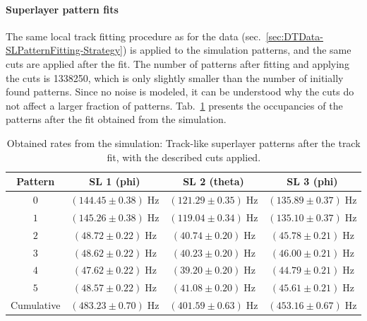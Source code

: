 \paragraph{Superlayer pattern fits}
The same local track fitting procedure as for the data (sec.\ \ref{sec:DTData-SLPatternFitting-Strategy}) is applied to the simulation patterns, and the same cuts are applied after the fit. The number of patterns after fitting and applying the cuts is \num{1338250}, which is only slightly smaller than the number of initially found patterns. Since no noise is modeled, it can be understood why the cuts do not affect a larger fraction of patterns. Tab.\ \ref{tab:Simulation-SLPatternFit-PatternOccupancies} presents the occupancies of the patterns after the fit obtained from the simulation.
\begin{table}[htb]
\centering  %
\begin{tabular}{|c|c|c|c|}
\hline
Pattern & \ac{SL} 1 (phi) & \ac{SL} 2 (theta) & \ac{SL} 3 (phi) \\ \hline
$0$ & $(144.45 \pm 0.38)\;\si{\hertz}$ & $(121.29 \pm 0.35)\;\si{\hertz}$ & $(135.89 \pm 0.37)\;\si{\hertz}$ \\
$1$ & $(145.26 \pm 0.38)\;\si{\hertz}$ & $(119.04 \pm 0.34)\;\si{\hertz}$ & $(135.10 \pm 0.37)\;\si{\hertz}$ \\
$2$ & $(48.72 \pm 0.22)\;\si{\hertz}$ & $(40.74 \pm 0.20)\;\si{\hertz}$ & $(45.78 \pm 0.21)\;\si{\hertz}$ \\
$3$ & $(48.62 \pm 0.22)\;\si{\hertz}$ & $(40.23 \pm 0.20)\;\si{\hertz}$ & $(46.00 \pm 0.21)\;\si{\hertz}$ \\
$4$ & $(47.62 \pm 0.22)\;\si{\hertz}$ & $(39.20 \pm 0.20)\;\si{\hertz}$ & $(44.79 \pm 0.21)\;\si{\hertz}$ \\
$5$ & $(48.57 \pm 0.22)\;\si{\hertz}$ & $(41.08 \pm 0.20)\;\si{\hertz}$ & $(45.61 \pm 0.21)\;\si{\hertz}$ \\ \hline
Cumulative & $(483.23 \pm 0.70)\;\si{\hertz}$ & $(401.59 \pm 0.63)\;\si{\hertz}$ & $(453.16 \pm 0.67)\;\si{\hertz}$ \\ \hline
\end{tabular}
\caption{Obtained rates from the simulation: Track-like superlayer patterns after the track fit, with the described cuts applied.}
\label{tab:Simulation-SLPatternFit-PatternOccupancies}
\end{table}

\FloatBarrier
\clearpage
